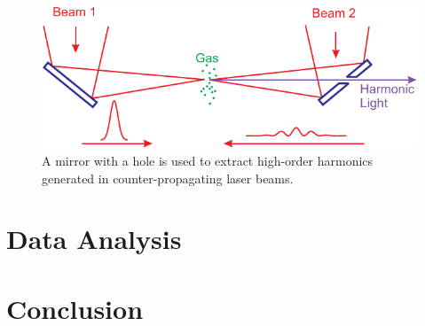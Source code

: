 \documentclass[oneside, astronomy, noacknowlegments]{BYUPhys}
\begin{document}
\begin{figure}
    \centerline{\includegraphics{Graphic1}}
    \caption[Experimental ODMR for CdTe]{\label{fig:CdTeResults}
     A mirror with a hole is used to extract high-order harmonics generated in
     counter-propagating laser beams.}
 \end{figure}


\section{Data Analysis}
\section{Conclusion}
\end{document}
